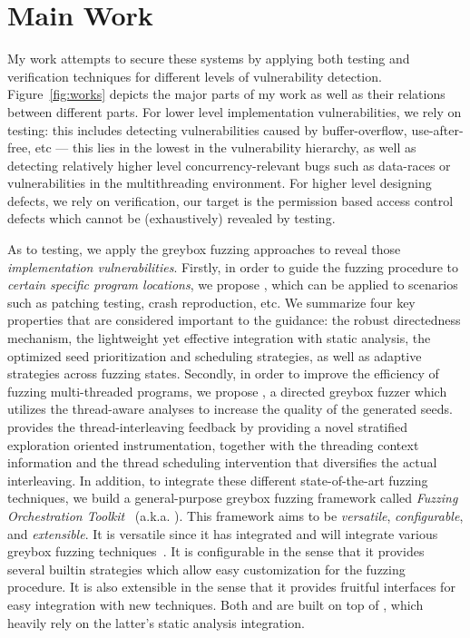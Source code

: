 \section{Main Work}

My work attempts to secure these systems by applying both testing and verification techniques for different levels of vulnerability detection.  Figure~\ref{fig:works} depicts the major parts of my work as well as their relations between different parts. For lower level implementation vulnerabilities, we rely on testing: this includes detecting vulnerabilities caused by buffer-overflow, use-after-free, etc --- this lies in the lowest in the vulnerability hierarchy, as well as detecting relatively higher level concurrency-relevant bugs such as data-races or vulnerabilities in the multithreading environment. For higher level designing defects, we rely on verification, our target is the permission based access control defects which cannot be (exhaustively) revealed by testing.

As to testing, we apply the greybox fuzzing approaches to reveal those \emph{implementation vulnerabilities}.
Firstly, in order to guide the fuzzing procedure to \emph{certain specific program locations}, we propose \dFOT, which can be applied to scenarios such as patching testing, crash reproduction, etc. We summarize four key properties that are considered important to the guidance: the robust directedness mechanism, the lightweight yet effective integration with static analysis, the optimized seed prioritization and scheduling strategies, as well as adaptive strategies across fuzzing states. 
Secondly, in order to improve the efficiency of fuzzing multi-threaded programs, we propose \mtfuzz, a directed greybox fuzzer which utilizes the thread-aware analyses to increase the quality of the generated seeds. \mtfuzz provides the thread-interleaving feedback by providing a novel stratified exploration oriented instrumentation, together with the threading context information and the thread scheduling intervention that diversifies the actual interleaving.
In addition, to integrate these different state-of-the-art fuzzing techniques, we build a general-purpose greybox fuzzing framework called \emph{Fuzzing Orchestration Toolkit}~\cite{fse18-fot} (a.k.a. \FOT). This framework aims to be \emph{versatile}, \emph{configurable}, and \emph{extensible}. It is versatile since it has integrated and will integrate various greybox fuzzing techniques~\cite{Bohme:2016:CGF,Bohme:2017:DGF,redqueen,CollAFL,Angora,fuzz_survey,junjie:2017sp:skyfire,LiCMLLT17,superion,Wen2020MemLock,Wang2020Typestate}. It is configurable in the sense that it provides several builtin strategies which allow easy customization for the fuzzing procedure. It is also extensible in the sense that it provides fruitful interfaces for easy integration with new techniques. Both \dFOT and \mtfuzz are built on top of \FOT, which heavily rely on the latter's static analysis integration.

